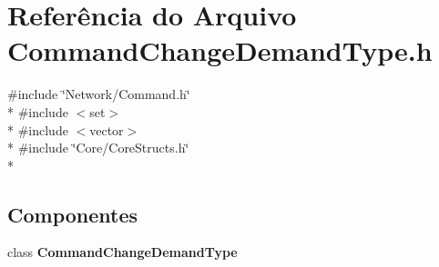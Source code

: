 \section{Referência do Arquivo Command\+Change\+Demand\+Type.\+h}
\label{_command_change_demand_type_8h}
{\ttfamily \#include \char`\"{}Network/\+Command.\+h\char`\"{}}\\*
{\ttfamily \#include $<$set$>$}\\*
{\ttfamily \#include $<$vector$>$}\\*
{\ttfamily \#include \char`\"{}Core/\+Core\+Structs.\+h\char`\"{}}\\*
\subsection*{Componentes}
\begin{DoxyCompactItemize}
\item 
class {\bf Command\+Change\+Demand\+Type}
\end{DoxyCompactItemize}
